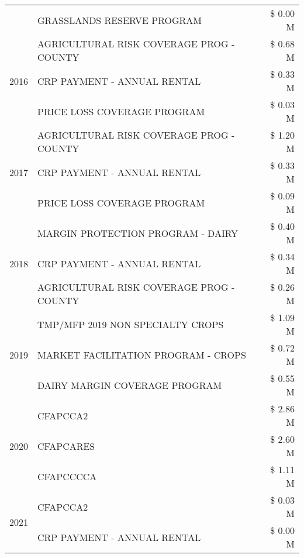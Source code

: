 \begin{tabular}{llr}
 & GRASSLANDS RESERVE PROGRAM & \$ 0.00 M \\
\cline{1-3}
\multirow[t]{3}{*}{2016} & AGRICULTURAL RISK COVERAGE PROG - COUNTY & \$ 0.68 M \\
 & CRP PAYMENT - ANNUAL RENTAL & \$ 0.33 M \\
 & PRICE LOSS COVERAGE PROGRAM & \$ 0.03 M \\
\cline{1-3}
\multirow[t]{3}{*}{2017} & AGRICULTURAL RISK COVERAGE PROG - COUNTY & \$ 1.20 M \\
 & CRP PAYMENT - ANNUAL RENTAL & \$ 0.33 M \\
 & PRICE LOSS COVERAGE PROGRAM & \$ 0.09 M \\
\cline{1-3}
\multirow[t]{3}{*}{2018} & MARGIN PROTECTION PROGRAM - DAIRY & \$ 0.40 M \\
 & CRP PAYMENT - ANNUAL RENTAL & \$ 0.34 M \\
 & AGRICULTURAL RISK COVERAGE PROG - COUNTY & \$ 0.26 M \\
\cline{1-3}
\multirow[t]{3}{*}{2019} & TMP/MFP 2019 NON SPECIALTY CROPS & \$ 1.09 M \\
 & MARKET FACILITATION PROGRAM - CROPS & \$ 0.72 M \\
 & DAIRY MARGIN COVERAGE PROGRAM & \$ 0.55 M \\
\cline{1-3}
\multirow[t]{3}{*}{2020} & CFAPCCA2 & \$ 2.86 M \\
 & CFAPCARES & \$ 2.60 M \\
 & CFAPCCCCA & \$ 1.11 M \\
\cline{1-3}
\multirow[t]{2}{*}{2021} & CFAPCCA2 & \$ 0.03 M \\
 & CRP PAYMENT - ANNUAL RENTAL & \$ 0.00 M \\
\cline{1-3}
\bottomrule
\end{tabular}
